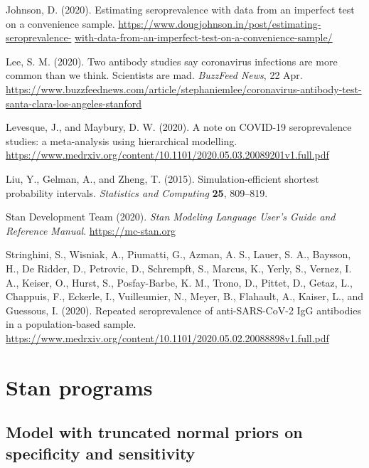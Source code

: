 \documentclass[11pt]{article}
\begin{document}
\bibitem Johnson, D. (2020).  Estimating seroprevalence with data from an imperfect test on a convenience sample.  {\small \url{https://www.dougjohnson.in/post/estimating-seroprevalence-}} {\small \url{with-data-from-an-imperfect-test-on-a-convenience-sample/}}

\bibitem Lee, S. M. (2020).  Two antibody studies say coronavirus infections are more common than we think. Scientists are mad.  {\em BuzzFeed News}, 22 Apr.  {\small \url{https://www.buzzfeednews.com/article/stephaniemlee/coronavirus-antibody-test-santa-clara-los-angeles-stanford}}

\bibitem Levesque, J., and Maybury, D. W. (2020).  A note on COVID-19 seroprevalence studies: a meta-analysis using hierarchical modelling.  {\small \url{https://www.medrxiv.org/content/10.1101/2020.05.03.20089201v1.full.pdf}}

\bibitem Liu, Y., Gelman, A., and Zheng, T. (2015).  Simulation-efficient shortest probability intervals. {\em Statistics and Computing} {\bf 25}, 809--819.

\bibitem Stan Development Team (2020). {\em Stan Modeling Language User's Guide and Reference Manual}.  {\small \url{https://mc-stan.org}}

\bibitem Stringhini, S., Wisniak, A., Piumatti, G., Azman, A. S., Lauer, S. A., Baysson, H., De Ridder, D., Petrovic, D.,  Schrempft, S., Marcus, K., Yerly, S., Vernez, I. A., Keiser, O., Hurst, S., Posfay-Barbe, K. M., Trono, D., Pittet, D., Getaz, L., Chappuis, F., Eckerle, I., Vuilleumier, N., Meyer, B., Flahault, A., Kaiser, L., and Guessous, I. (2020).  Repeated seroprevalence of anti-SARS-CoV-2 IgG antibodies in a population-based sample.  {\small \url{https://www.medrxiv.org/content/10.1101/2020.05.02.20088898v1.full.pdf}}

\pagebreak
\appendix

\section{Stan programs}

\subsection{Model with truncated normal priors on specificity and sensitivity}\label{stan1}

\vspace{-\baselineskip}
\begin{small}
  \begin{quotation}\noindent
    
  \end{quotation}
\end{small}
\end{document}

